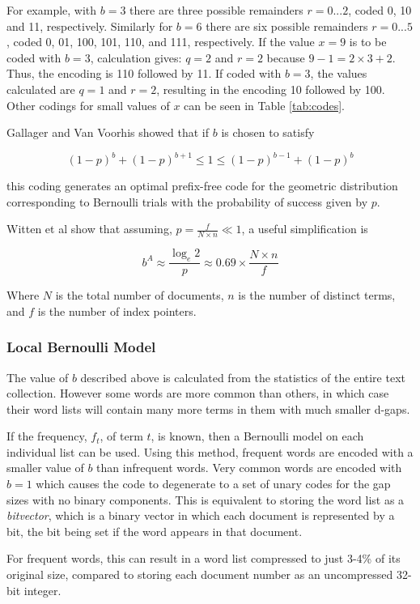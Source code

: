 For example, with $b = 3$ there are three possible remainders $r=0...2$, coded 0, 10 and 11, respectively.  Similarly for $b = 6$ there are six possible remainders $r = 0...5$, coded 0, 01, 100, 101, 110, and 111, respectively.  If the value $x = 9$ is to be coded with $b = 3$, calculation gives: $q=2$ and $r=2$ because $9-1 = 2\times3+2$.  Thus, the encoding is 110 followed by 11.  If coded with $b=3$, the values calculated are $q=1$ and $r=2$, resulting in the encoding 10 followed by 100.  Other codings for small values of $x$ can be seen in Table \ref{tab:codes}.

Gallager and Van Voorhis \cite{gallager75optimal} showed that if $b$ is chosen to satisfy

\[
(1-p)^b + (1-p)^{b+1} \leq 1 \leq (1-p)^{b-1} + (1-p)^b
\]

this coding generates an optimal prefix-free code for the geometric distribution corresponding to Bernoulli trials with the probability of success given by $p$.

Witten et al \cite{wmb:mg} show that assuming, $p = \frac{f}{N \times n} \ll 1$, a useful simplification is

\[
b^A \approx \frac{\log_e 2}{p} \approx 0.69 \times \frac{N \times n}{f}
\]

Where $N$ is the total number of documents, $n$ is the number of distinct terms, and $f$ is the number of index pointers.

\subsubsection{Local Bernoulli Model}
The value of $b$ described above is calculated from the statistics of the entire text collection.  However some words are more common than others, in which case their word lists will contain many more terms in them with much smaller d-gaps.

If the frequency, $f_t$, of term $t$, is known, then a Bernoulli model on each individual list can be used.  Using this method, frequent words are encoded with a smaller value of $b$ than infrequent words.  Very common words are encoded with $b=1$ which causes the code to degenerate to a set of unary codes for the gap sizes with no binary components.  This is equivalent to storing the word list as a \emph{bitvector}, which is a binary vector in which each document is represented by a bit, the bit being set if the word appears in that document.

For frequent words, this can result in a word list compressed to just 3-4\% of its original size, compared to storing each document number as an uncompressed 32-bit integer.

